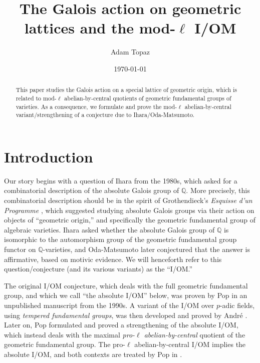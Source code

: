 \documentclass[11pt]{amsart}
\title{The Galois action on geometric lattices and the mod-$\ell$ I/OM}
\author{Adam Topaz}
\date{\today}
\theoremstyle{definition}
\theoremstyle{remark}
\numberwithin{equation}{section}
\newcommand{\Q}{\mathbb{Q}}
\begin{document}

\maketitle

\begin{abstract}
  This paper studies the Galois action on a special lattice of geometric origin, which is related to mod-$\ell$ abelian-by-central quotients of geometric fundamental groups of varieties.
  As a consequence, we formulate and prove the mod-$\ell$ abelian-by-central variant/strengthening of a conjecture due to {\sc Ihara/Oda-Matsumoto}.
\end{abstract}

\tableofcontents

\section{Introduction}
\label{section: intro}


Our story begins with a question of {\sc Ihara} from the 1980s, which asked for a combinatorial description of the absolute Galois group of $\Q$.
More precisely, this combinatorial description should be in the spirit of {\sc Grothendieck's} \emph{Esquisse d'un Programme} \cite{Grothendieck:1997}, which suggested studying absolute Galois groups via their action on objects of ``geometric origin,'' and specifically the geometric fundamental group of algebraic varieties.
{\sc Ihara} asked whether the absolute Galois group of $\Q$ is isomorphic to the automorphism group of the geometric fundamental group functor on $\Q$-varieties, and {\sc Oda-Matsumoto} \cite{Matsumoto:1997} later conjectured that the answer is affirmative, based on motivic evidence.
We will henceforth refer to this question/conjecture (and its various variants) as the ``I/OM.''

The original I/OM conjecture, which deals with the full geometric fundamental group, and which we call ``the absolute I/OM'' below, was proven by {\sc Pop} in an unpublished manuscript from the 1990s.
A variant of the I/OM over $p$-adic fields, using \emph{tempered fundamental groups}, was then developed and proved by {\sc Andr\'e} \cite{Andre:2003}. 
Later on, {\sc Pop} formulated and proved a strengthening of the absolute I/OM, which instead deals with the maximal \emph{pro-$\ell$ abelian-by-central} quotient of the geometric fundamental group.
The pro-$\ell$ abelian-by-central I/OM implies the absolute I/OM, and both contexts are treated by {\sc Pop} in \cite{Pop:2014}.
\end{document}
